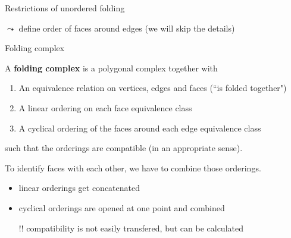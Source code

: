 \begin{frame}{Restrictions of unordered folding}
\begin{center}
    \end{center}

    \pause
    $\leadsto$ define order of faces around edges
    \pause
    (we will skip the details)
\end{frame}


\begin{frame}{Folding complex}
    \pause
    \begin{defi}
        A \textbf{folding complex}
        \pause
        is a polygonal complex together with
        \begin{enumerate}
            \pause
            \item An equivalence relation on vertices, edges and faces
                \pause (``is folded together")
            \pause
            \item A linear ordering on each face equivalence class
            \pause
            \item A cyclical ordering of the faces around each edge equivalence class
        \end{enumerate}
        \pause
        such that the orderings are compatible
        \pause
        (in an appropriate sense).
    \end{defi}

    \pause
    To identify faces with each other, we have to combine those orderings.
    \begin{itemize}
        \pause
        \item linear orderings get concatenated
        \pause
        \item cyclical orderings are opened at one point
            \pause
            and combined
        \pause
        \item[!!] compatibility is not easily transfered,
            \pause
            but can be calculated
    \end{itemize}

\end{frame}


